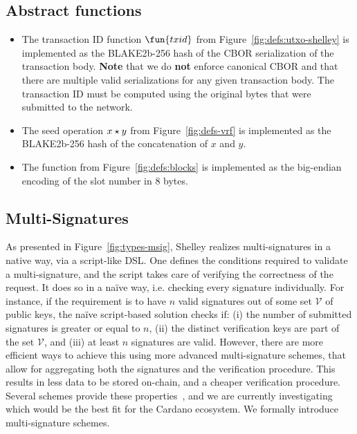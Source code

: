 \subsection{Abstract functions}
\label{sec:abstract-funcs-implementation}

\begin{itemize}
  \item The transaction ID function $\fun{txid}$ from Figure~\ref{fig:defs:utxo-shelley} is implemented
        as the BLAKE2b-256 hash of the CBOR serialization of the transaction body.
        \textbf{Note} that we do \textbf{not} enforce canonical CBOR and that there are
        multiple valid serializations for any given transaction body.
        The transaction ID must be computed using the original bytes that were
        submitted to the network.
  \item The seed operation $x \star y$ from Figure~\ref{fig:defs-vrf} is implemented
        as the BLAKE2b-256 hash of the concatenation of $x$ and $y$.
  \item The function  from Figure~\ref{fig:defs:blocks} is implemented
        as the big-endian encoding of the slot number in 8 bytes.
\end{itemize}


\subsection{Multi-Signatures}
As presented in Figure~\ref{fig:types-msig}, Shelley realizes multi-signatures 
in a native way, via a script-like DSL. One defines the conditions required to 
validate a multi-signature, and the script takes care of verifying the 
correctness of the request. It does so in a na\"ive way, i.e. checking every 
signature individually. For instance, if the requirement is to have $n$ valid 
signatures out of some set $\mathcal{V}$ of public keys, the na\"ive 
script-based solution checks if: (i) the number of submitted signatures is 
greater or equal to $n$, (ii) the distinct verification keys are part of the set 
$\mathcal{V}$, and (iii) at least $n$ signatures are valid. However, there are 
more efficient ways to achieve this using more advanced multi-signature schemes, 
that allow for aggregating both the signatures and the verification procedure. 
This results in less data to be stored on-chain, and a cheaper verification 
procedure. Several schemes provide these properties~\cite{musigBoneh, musig, 
musig2, pixel}, and we are currently investigating which would be the best fit 
for the Cardano ecosystem. We formally introduce multi-signature schemes.

